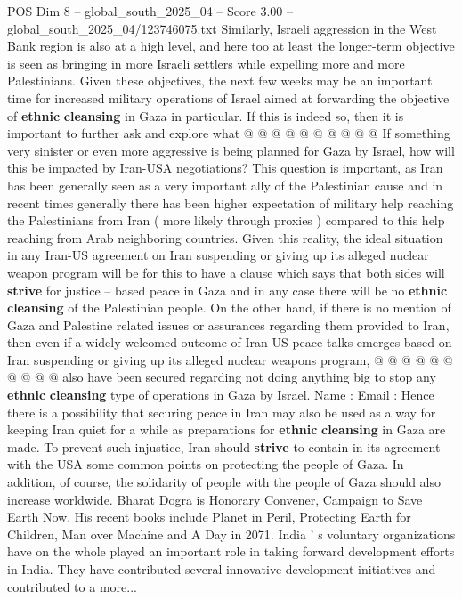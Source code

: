 \begin{textsample}{POS Dim 8 – global\_south\_2025\_04 – Score 3.00 – global\_south\_2025\_04/123746075.txt}
Similarly, Israeli aggression in the West Bank region is also at a high level, and here too at least the longer-term objective is seen as bringing in more Israeli settlers while expelling more and more Palestinians.
Given these objectives, the next few weeks may be an important time for increased military operations of Israel aimed at forwarding the objective of \textbf{ethnic} \textbf{cleansing} in Gaza in particular.
If this is indeed so, then it is important to further ask and explore what @ @ @ @ @ @ @ @ @ @ If something very sinister or even more aggressive is being planned for Gaza by Israel, how will this be impacted by Iran-USA negotiations?
This question is important, as Iran has been generally seen as a very important ally of the Palestinian cause and in recent times generally there has been higher expectation of military help reaching the Palestinians from Iran ( more likely through proxies ) compared to this help reaching from Arab neighboring countries.
Given this reality, the ideal situation in any Iran-US agreement on Iran suspending or giving up its alleged nuclear weapon program will be for this to have a clause which says that both sides will \textbf{strive} for justice -- based peace in Gaza and in any case there will be no \textbf{ethnic} \textbf{cleansing} of the Palestinian people.
On the other hand, if there is no mention of Gaza and Palestine related issues or assurances regarding them provided to Iran, then even if a widely welcomed outcome of Iran-US peace talks emerges based on Iran suspending or giving up its alleged nuclear weapons program, @ @ @ @ @ @ @ @ @ @ also have been secured regarding not doing anything big to stop any \textbf{ethnic} \textbf{cleansing} type of operations in Gaza by Israel.
Name : Email : Hence there is a possibility that securing peace in Iran may also be used as a way for keeping Iran quiet for a while as preparations for \textbf{ethnic} \textbf{cleansing} in Gaza are made.
To prevent such injustice, Iran should \textbf{strive} to contain in its agreement with the USA some common points on protecting the people of Gaza.
In addition, of course, the solidarity of people with the people of Gaza should also increase worldwide.
Bharat Dogra is Honorary Convener, Campaign to Save Earth Now.
His recent books include Planet in Peril, Protecting Earth for Children, Man over Machine and A Day in 2071.
India ' s voluntary organizations have on the whole played an important role in taking forward development efforts in India.
They have contributed several innovative development initiatives and contributed to a more...

\end{textsample}
